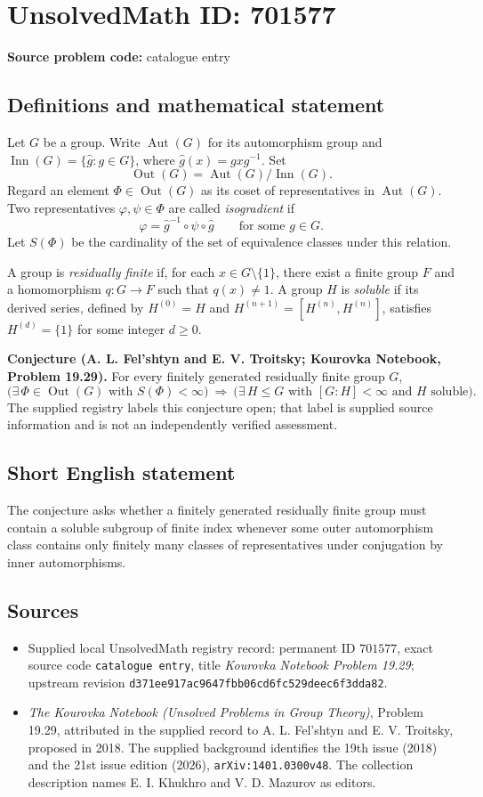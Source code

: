\documentclass[11pt]{article}
\begin{document}
\section*{UnsolvedMath ID: 701577}
\textbf{Source problem code:} catalogue entry
\subsection{Definitions and mathematical statement}
Let \(G\) be a group. Write \(\operatorname{Aut}(G)\) for its automorphism group and \(\operatorname{Inn}(G)=\{\widehat g:g\in G\}\), where \(\widehat g(x)=gxg^{-1}\). Set
\[
\operatorname{Out}(G)=\operatorname{Aut}(G)/\operatorname{Inn}(G).
\]
Regard an element \(\Phi\in\operatorname{Out}(G)\) as its coset of representatives in \(\operatorname{Aut}(G)\). Two representatives \(\varphi,\psi\in\Phi\) are called \emph{isogradient} if
\[
\varphi=\widehat g^{-1}\circ\psi\circ\widehat g
\qquad\text{for some }g\in G.
\]
Let \(S(\Phi)\) be the cardinality of the set of equivalence classes under this relation.

A group is \emph{residually finite} if, for each \(x\in G\setminus\{1\}\), there exist a finite group \(F\) and a homomorphism \(q:G\to F\) such that \(q(x)\ne1\). A group \(H\) is \emph{soluble} if its derived series, defined by \(H^{(0)}=H\) and \(H^{(n+1)}=[H^{(n)},H^{(n)}]\), satisfies \(H^{(d)}=\{1\}\) for some integer \(d\ge0\).

\textbf{Conjecture (A. L. Fel'shtyn and E. V. Troitsky; Kourovka Notebook, Problem 19.29).} For every finitely generated residually finite group \(G\),
\[
\bigl(\exists\,\Phi\in\operatorname{Out}(G)\text{ with }S(\Phi)<\infty\bigr)
\ \Longrightarrow\ 
\bigl(\exists\,H\le G\text{ with }[G:H]<\infty
\text{ and }H\text{ soluble}\bigr).
\]
The supplied registry labels this conjecture open; that label is supplied source information and is not an independently verified assessment.
\subsection{Short English statement}
The conjecture asks whether a finitely generated residually finite group must contain a soluble subgroup of finite index whenever some outer automorphism class contains only finitely many classes of representatives under conjugation by inner automorphisms.
\subsection{Sources}
\begin{itemize}
\item Supplied local UnsolvedMath registry record: permanent ID \(701577\), exact source code \texttt{catalogue entry}, title \emph{Kourovka Notebook Problem 19.29}; upstream revision \texttt{d371ee917ac9647fbb06cd6fc529deec6f3dda82}.
\item \emph{The Kourovka Notebook (Unsolved Problems in Group Theory)}, Problem 19.29, attributed in the supplied record to A. L. Fel'shtyn and E. V. Troitsky, proposed in 2018. The supplied background identifies the 19th issue (2018) and the 21st issue edition (2026), \texttt{arXiv:1401.0300v48}. The collection description names E. I. Khukhro and V. D. Mazurov as editors.
\end{itemize}
\end{document}

